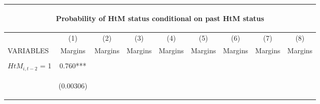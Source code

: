\begin{center}
\begin{tabular}{lcccccccc}
\multicolumn{9}{c}{\begin{large}Probability of HtM status conditional on past HtM status\end{large}} \\ \hline
 & (1) & (2) & (3) & (4) & (5) & (6) & (7) & (8) \\
VARIABLES & Margins & Margins & Margins & Margins & Margins & Margins & Margins & Margins \\ \hline
\vspace{4pt} & \begin{footnotesize}\end{footnotesize} & \begin{footnotesize}\end{footnotesize} & \begin{footnotesize}\end{footnotesize} & \begin{footnotesize}\end{footnotesize} & \begin{footnotesize}\end{footnotesize} & \begin{footnotesize}\end{footnotesize} & \begin{footnotesize}\end{footnotesize} & \begin{footnotesize}\end{footnotesize} \\
$ {HtM}_{i, t-2} $ = 1 & 0.760*** &  &  &  &  &  &  &  \\
\vspace{4pt} & \begin{footnotesize}(0.00306)\end{footnotesize} & \begin{footnotesize}\end{footnotesize} & \begin{footnotesize}\end{footnotesize} & \begin{footnotesize}\end{footnotesize} & \begin{footnotesize}\end{footnotesize} & \begin{footnotesize}\end{footnotesize} & \begin{footnotesize}\end{footnotesize} & \begin{footnotesize}\end{footnotesize} \\

\end{tabular}
\end{center}

